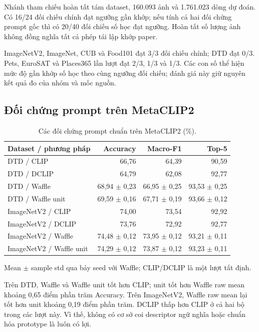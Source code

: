 \documentclass[12pt,a4paper]{article}
\newcommand{\BodySize}{13}
\newcommand{\BodyLeading}{15.6}
\newcommand{\BodyFont}{\fontsize{\BodySize}{\BodyLeading}\selectfont}
\numberwithin{figure}{section}
\numberwithin{table}{section}
\numberwithin{equation}{section}
\begin{document}
Nhánh tham chiếu hoàn tất tám dataset, 160.093 ảnh và 1.761.023 dòng dự đoán. Có 16/24 đối chiếu
chính đạt ngưỡng gần khớp; nếu tính cả hai đối chứng prompt gốc thì có 20/40 đối chiếu số học đạt
ngưỡng. Hoàn tất số lượng ảnh không đồng nghĩa tất cả phép tái lập khớp paper.

ImageNetV2, ImageNet, CUB và Food101 đạt 3/3 đối chiếu chính; DTD đạt 0/3. Pets, EuroSAT và Places365 lần lượt đạt 2/3, 1/3 và 1/3. Các con số thể hiện mức độ gần khớp số học theo cùng ngưỡng đối chiếu; đánh giá này giữ nguyên kết quả đo của nhóm và mốc nguồn.

\subsection{Đối chứng prompt trên MetaCLIP2}

\begin{table}[H]

\centering
\BodyFont
\caption{Các đối chứng prompt chuẩn trên MetaCLIP2 (\%).}
\begin{tabularx}{\linewidth}{@{}L r r r@{}}
\toprule
Dataset / phương pháp & Accuracy & Macro-F1 & Top-5\\
\midrule
DTD / CLIP & 66,76 & 64,39 & 90,59\\
DTD / DCLIP & 64,79 & 62,08 & 92,77\\
DTD / Waffle & 68,94 $\pm$ 0,23 & 66,95 $\pm$ 0,25 & 93,53 $\pm$ 0,25\\
DTD / Waffle unit & 69,59 $\pm$ 0,16 & 67,71 $\pm$ 0,19 & 93,66 $\pm$ 0,12\\
ImageNetV2 / CLIP & 74,00 & 73,54 & 92,92\\
ImageNetV2 / DCLIP & 73,76 & 72,92 & 92,77\\
ImageNetV2 / Waffle & 74,48 $\pm$ 0,12 & 73,95 $\pm$ 0,12 & 93,21 $\pm$ 0,11\\
ImageNetV2 / Waffle unit & 74,29 $\pm$ 0,12 & 73,87 $\pm$ 0,12 & 93,23 $\pm$ 0,11\\
\bottomrule
\end{tabularx}
\par\medskip
\begin{minipage}{\linewidth}
    \BodyFont
Mean $\pm$ sample std qua bảy seed với Waffle; CLIP/DCLIP là một lượt tất định.
\end{minipage}

\end{table}

Trên DTD, Waffle và Waffle unit tốt hơn CLIP; unit tốt hơn Waffle raw mean khoảng 0,65 điểm phần
trăm Accuracy. Trên ImageNetV2, Waffle raw mean lại tốt hơn unit khoảng 0,19 điểm phần trăm. DCLIP
thấp hơn CLIP ở cả hai bộ trong các lượt này. Vì thế, không có cơ sở coi descriptor ngữ nghĩa hoặc
chuẩn hóa prototype là luôn có lợi.
\end{document}
